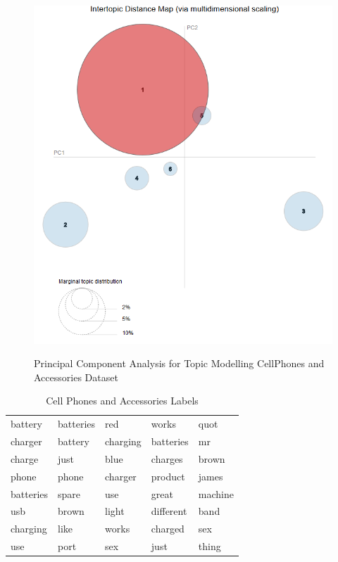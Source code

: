 \begin{figure}[H]
  {\includegraphics[width = 0.85 \textwidth]{img/lda/3.PNG}}
  \caption{Principal Component Analysis for Topic Modelling CellPhones and Accessories Dataset}
\end{figure}


\begin{table}[h]
\centering
\begin{tabular}{ lllll }
\midrule
battery & batteries & red   & works  & quot  \\
charger & battery & charging & batteries  & mr  \\
charge & just   & blue  & charges     & brown  \\ 
phone & phone  &  charger  & product    & james  \\ 
batteries  & spare & use  & great   & machine \\ 
usb & brown & light & different  & band  \\ 
charging & like  &  works & charged  &  sex \\ 
use & port & sex & just &  thing  \\ 
\bottomrule          
\end{tabular}
\caption{Cell Phones and Accessories Labels}
\label{Cell Phones and Accessories Labels}
\end{table}

